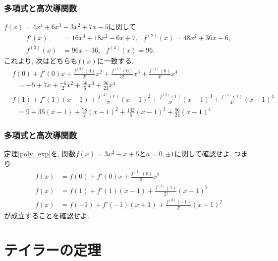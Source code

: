 \begin{frame}
\frametitle{多項式と高次導関数}

$f(x)= 4x^4+6x^3-3x^2+7x-5$に関して
\begin{align*}
f'(x) & = 16x^3+18x^2-6x+7, \ \ \ f^{(2)}(x)  = 48x^2+36x-6, \\
f^{(3)}(x) & = 96x+36, \ \ \ f^{(4)}(x)  = 96. 
\end{align*}
これより, 次はどちらも$f(x)$に一致する. 
\begin{align*}
&  f(0)+ f'(0)x + \frac{f^{(2)}(0)}{2!}x^2  + \frac{f^{(3)}(0)}{3!}x^3+  \frac{f^{(4)}(0)}{4!}x^4 \\
& \ \ \ = -5 + 7x + \frac{-6}{2}x^2+\frac{36}{6}x^3+\frac{96}{24}x^4 \\
&  f(1)+ f'(1)(x-1) + \frac{f^{(2)}(1)}{2!}(x-1)^2  + \frac{f^{(3)}(1)}{3!}(x-1)^3+  \frac{f^{(4)}(1)}{4!}(x-1)^4 \\
& \ \ \ = 9 + 35(x-1) + \frac{78}{2}(x-1)^2+\frac{132}{6}(x-1)^3+\frac{96}{24}(x-1)^4 
\end{align*}

\end{frame}







\begin{frame}
\frametitle{多項式と高次導関数}

\begin{Prob}
定理\ref{poly_exp}を, 関数$f(x)=3x^2-x+5$と$a=0,\pm1$に関して確認せよ. つまり
\begin{align*}
f(x) & = f(0)+ f'(0)x + \frac{f^{(2)}(0)}{2!}x^2 \\
f(x) & = f(1)+ f'(1)(x-1) + \frac{f^{(2)}(1)}{2!}(x-1)^2 \\
f(x) & = f(-1)+ f'(-1)(x+1) + \frac{f^{(2)}(-1)}{2!}(x+1)^2 
\end{align*}
が成立することを確認せよ. 
\end{Prob}


\end{frame}

\section{テイラーの定理}

